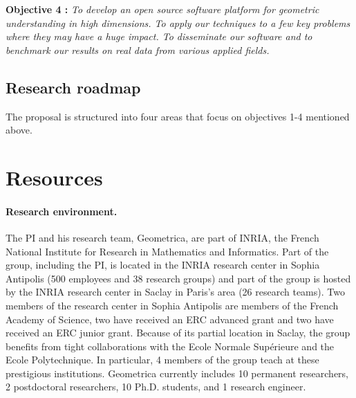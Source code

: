 {\bf Objective 4 :}   {\em To develop an open source {\em  software platform for geometric understanding in high dimensions}. %
To apply our techniques to a few key problems where they may have a huge impact. To disseminate our software and to benchmark our results on real data from various applied fields.}

\subsection{Research roadmap} 


%


The proposal is structured into four areas that focus on objectives 1-4 mentioned above.









\section{Resources}

\paragraph{Research environment.}
The PI and his research team, Geometrica, are part of INRIA, the French National Institute for Research in Mathematics and Informatics. Part of the group, including the PI, is located in the INRIA research center in Sophia Antipolis  (500 employees and 38 research groups) and part of the group is hosted by the INRIA research center in Saclay in Paris's area (26 research teams). Two members of the research center in Sophia Antipolis are members of the French Academy of Science, two have received an ERC advanced grant and two have received an ERC junior grant. Because of its partial location in Saclay, the group benefits from tight collaborations with the Ecole Normale Sup\'erieure and the Ecole Polytechnique. In particular, 4 members of the group teach at these prestigious institutions. Geometrica currently includes 10 permanent researchers,  2 postdoctoral researchers, 10 Ph.D. students, and 1 research engineer. 

